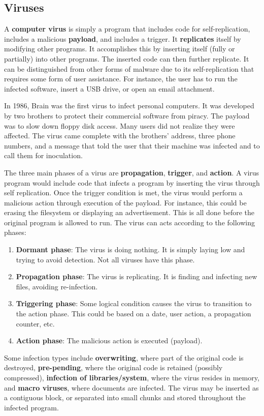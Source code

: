 \documentclass[11pt]{article}
\theoremstyle{plain} %
\theoremstyle{definition}
\theoremstyle{example}
\theoremstyle{remark}
\begin{document}
\subsection{Viruses}
A \textbf{computer virus} is simply a program that includes code for self-replication, includes a malicious \textbf{payload}, and includes a trigger. It \textbf{replicates} itself by modifying other programs. It accomplishes this by inserting itself (fully or partially) into other programs. The inserted code can then further replicate. It can be distinguished from other forms of malware due to its self-replication that requires some form of user assistance. For instance, the user has to run the infected software, insert a USB drive, or open an email attachment. 

In 1986, Brain was the first virus to infect personal computers. It was developed by two brothers to protect their commercial software from piracy. The payload was to slow down floppy disk access. Many users did not realize they were affected. The virus came complete with the brothers' address, three phone numbers, and a message that told the user that their machine was infected and to call them for inoculation.

The three main phases of a virus are \textbf{propagation}, \textbf{trigger}, and \textbf{action}. A virus program would include code that infects a program by inserting the virus through self replication. Once the trigger condition is met, the virus would perform a malicious action through execution of the payload. For instance, this could be erasing the filesystem or displaying an advertisement. This is all done before the original program is allowed to run. The virus can acts according to the following phases:
\begin{enumerate}
	\item \textbf{Dormant phase}: The virus is doing nothing. It is simply laying low and trying to avoid detection. Not all viruses have this phase. 
	\item \textbf{Propagation phase}: The virus is replicating. It is finding and infecting new files, avoiding re-infection.
	\item \textbf{Triggering phase}: Some logical condition causes the virus to transition to the action phase. This could be based on a date, user action, a propagation counter, etc.
	\item \textbf{Action phase}: The malicious action is executed (payload). 
\end{enumerate}
Some infection types include \textbf{overwriting}, where part of the original code is destroyed, \textbf{pre-pending}, where the original code is retained (possibly compressed), \textbf{infection of libraries/system}, where the virus resides in memory, and \textbf{macro viruses}, where documents are infected. The virus may be inserted as a contiguous block, or separated into small chunks and stored throughout the infected program. 
\end{document}
